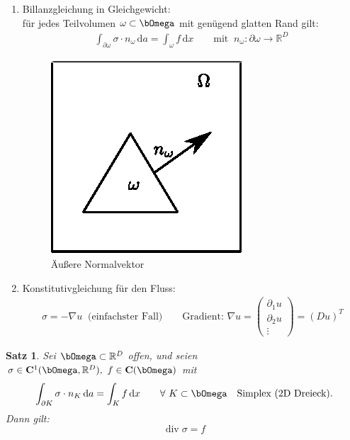 \documentclass[12pt,twoside,reqno]{article}
\newcommand{\dx}{\,\mathrm{d}x}
\newcommand{\da}{\,\mathrm{d}a}
\renewcommand\div{\operatorname{div}}
\renewcommand{\Omega}{\bOmega}
\newcommand\bC{\mathbf{C}}
\newcommand{\R}{\mathbb{R}}
\theoremstyle{TheoWieners}
\newtheorem{Satz}[theow]{Satz}
\theoremstyle{break}
\theoremstyle{app}
\newtheorem{Spezielle Lösungen}[app]{Spezielle Lösungen}
\newtheorem{Spezielle Lösungen der Poisson-Gleichung}[app]{Spezielle Lösungen der Poisson-Gleichung}
\newtheorem{Kartesische Gitter in 2-d}[app]{Kartesische Gitter in 2-d}
\newtheorem{Diskretisierungen hoher Ordnung}[app]{Diskretisierungen hoher Ordnung}
\newtheorem{Zyklische Reduktion}[app]{Zyklische Reduktion}
\begin{document}
\begin{enumerate}[1)]
  \item
      Billanzgleichung in Gleichgewicht: \\ \qquad  \qquad für jedes Teilvolumen $\omega \subset \Omega$ mit genügend glatten Rand gilt:
\begin{eqnarray*}
      \int_{\partial \omega} \sigma \cdot n_{\omega} \da = \int_{\omega} f \dx  \qquad \text{mit  } \ n_{\omega} : \partial \omega \rightarrow \R^D \ \text{}
\end{eqnarray*}
      \begin{figure}[!htb]
\centering
\includegraphics[scale=.7]{grafik/Zeichnung-4.eps}
\caption{Äu\ss ere Normalvektor}
\label{fig:digraph}
\end{figure}

  \item
     Konstitutivgleichung für den Fluss:
     \begin{eqnarray*}
    \sigma = - \nabla u \ \text{ (einfachster Fall)} \qquad
    \text{Gradient: } \nabla u =  \left(\begin{smallmatrix}
                \partial_1 u  \\
                \partial_2 u \\
                \vdots
              \end{smallmatrix}\right) = (Du)^T
\end{eqnarray*}
     \end{enumerate}
\begin{Satz}
    \label{satz:1.1}
    Sei $\Omega \subset \R^D$ offen, und seien $\sigma \in \bC^1 (\Omega, \R^D), \ f \in \bC(\Omega) $  mit $$  \int_{\partial K} \sigma \cdot n_{K} \da = \int_{K} f \dx  \qquad \forall \ K \subset \Omega \ \ \text{   Simplex (2D Dreieck).}$$ Dann gilt:  $$\div \sigma =f$$
\end{Satz}
\end{document}
